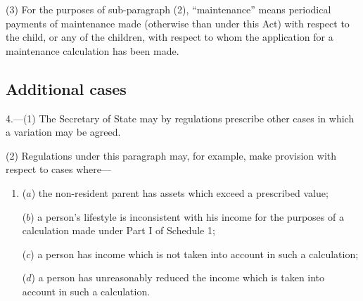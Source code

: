 \documentclass[a4paper]{article}
\begin{document}
{(3) For the purposes of sub-paragraph (2), “maintenance” means periodical payments of maintenance made (otherwise than under this Act) with respect to the child, or any of the children, with respect to whom the application for a maintenance calculation has been made.


\subsection*{Additional cases}

4.—(1) The Secretary of State may by regulations prescribe other cases in which a variation may be agreed.

(2) Regulations under this paragraph may, for example, make provision with respect to cases where---
\begin{enumerate}\item[]
($a$) the non-resident parent has assets which exceed a prescribed value;

($b$) a person’s lifestyle is inconsistent with his income for the purposes of a calculation made under Part I of Schedule 1;

($c$) a person has income which is not taken into account in such a calculation;

($d$) a person has unreasonably reduced the income which is taken into account in such a calculation.
\end{enumerate}

}
\end{document}

